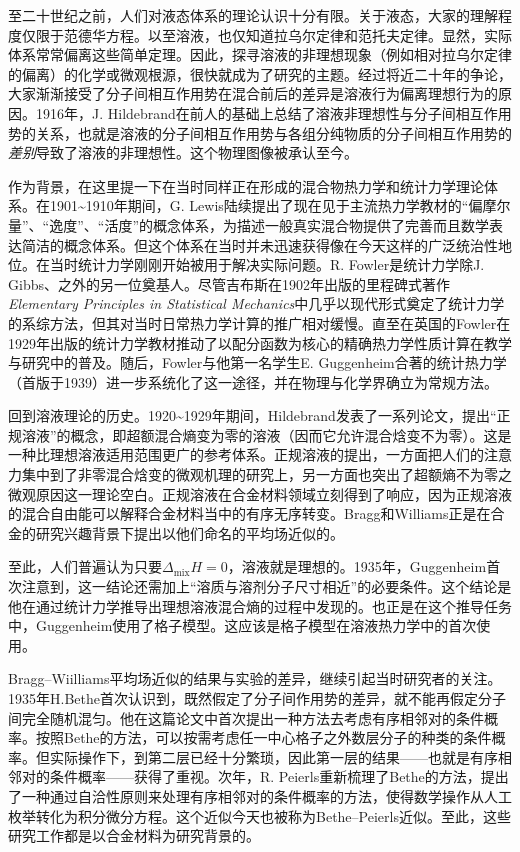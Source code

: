 \documentclass[main.tex]{subfiles}
\begin{document}
至二十世纪之前，人们对液态体系的理论认识十分有限。关于液态，大家的理解程度仅限于范德华方程。以至溶液，也仅知道拉乌尔定律和范托夫定律。显然，实际体系常常偏离这些简单定理。因此，探寻溶液的非理想现象（例如相对拉乌尔定律的偏离）的化学或微观根源，很快就成为了研究的主题\cite{Hildebrand1981}。经过将近二十年的争论，大家渐渐接受了分子间相互作用势在混合前后的差异是溶液行为偏离理想行为的原因。1916年，J. Hildebrand在前人的基础上总结了溶液非理想性与分子间相互作用势的关系\cite{Hildebrand1916}，也就是溶液的分子间相互作用势与各组分纯物质的分子间相互作用势的\emph{差别}导致了溶液的非理想性。这个物理图像被承认至今。

作为背景，在这里提一下在当时同样正在形成的混合物热力学和统计力学理论体系。在1901\textasciitilde 1910年期间，G. Lewis陆续提出了现在见于主流热力学教材的“偏摩尔量”、“逸度”、“活度”的概念体系\cite{Lewis1901,Lewis1907}，为描述一般真实混合物提供了完善而且数学表达简洁的概念体系。但这个体系在当时并未迅速获得像在今天这样的广泛统治性地位。在当时统计力学刚刚开始被用于解决实际问题。R. Fowler是统计力学除J. Gibbs、之外的另一位奠基人。尽管吉布斯在1902年出版的里程碑式著作\emph{Elementary Principles in Statistical Mechanics}\cite{Gibbs1902}中几乎以现代形式奠定了统计力学的系综方法，但其对当时日常热力学计算的推广相对缓慢。直至在英国的Fowler在1929年出版的统计力学教材\cite{Fowler1929}推动了以配分函数为核心的精确热力学性质计算在教学与研究中的普及。随后，Fowler与他第一名学生E. Guggenheim合著的统计热力学（首版于1939）\cite{Fowler1939}进一步系统化了这一途径，并在物理与化学界确立为常规方法。

回到溶液理论的历史。1920\textasciitilde 1929年期间，Hildebrand发表了一系列论文，提出“正规溶液”的概念\cite{Hildebrand1951}，即超额混合熵变为零的溶液（因而它允许混合焓变不为零）。这是一种比理想溶液适用范围更广的参考体系。正规溶液的提出，一方面把人们的注意力集中到了非零混合焓变的微观机理的研究上，另一方面也突出了超额熵不为零之微观原因这一理论空白。正规溶液在合金材料领域立刻得到了响应，因为正规溶液的混合自由能可以解释合金材料当中的有序无序转变。Bragg和Williams\cite{Bragg1934,Bragg1935}正是在合金的研究兴趣背景下提出以他们命名的平均场近似的。

至此，人们普遍认为只要$\Delta_\text{mix}H= 0$，溶液就是理想的。1935年，Guggenheim首次注意到\cite{Guggenheim1935}，这一结论还需加上“溶质与溶剂分子尺寸相近”的必要条件。这个结论是他在通过统计力学推导出理想溶液混合熵的过程中发现的。也正是在这个推导任务中，Guggenheim使用了格子模型。这应该是格子模型在溶液热力学中的首次使用。

Bragg--Wiilliams平均场近似的结果与实验的差异，继续引起当时研究者的关注。1935年H.Bethe首次认识到，既然假定了分子间作用势的差异，就不能再假定分子间完全随机混匀\cite{Bethe1935}。他在这篇论文中首次提出一种方法去考虑有序相邻对的条件概率。按照Bethe的方法，可以按需考虑任一中心格子之外数层分子的种类的条件概率。但实际操作下，到第二层已经十分繁琐，因此第一层的结果——也就是有序相邻对的条件概率——获得了重视。次年，R. Peierls重新梳理了Bethe的方法，提出了一种通过自洽性原则来处理有序相邻对的条件概率的方法\cite{Peierls1936}，使得数学操作从人工枚举转化为积分微分方程。这个近似今天也被称为Bethe--Peierls近似。至此，这些研究工作都是以合金材料为研究背景的。
\end{document}
